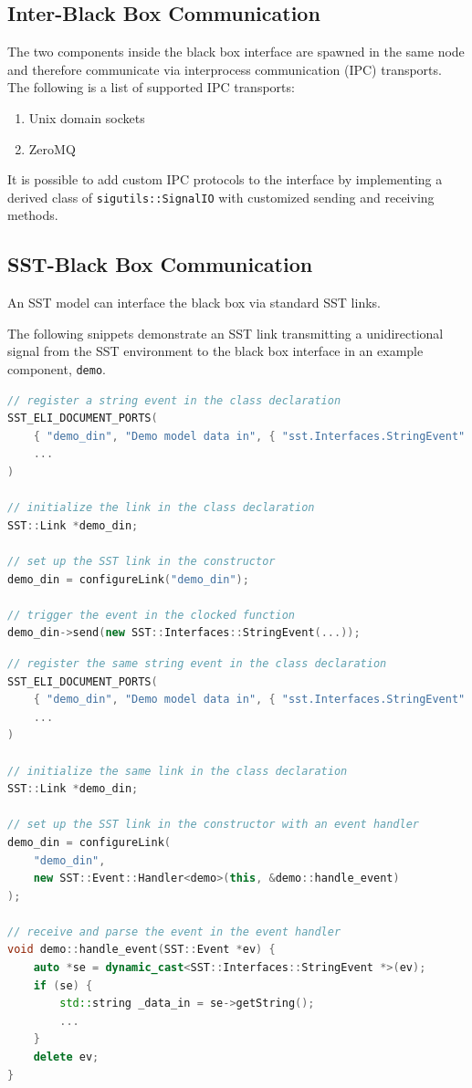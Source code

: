 \documentclass{article}
\begin{document}
    \subsection{Inter-Black Box Communication}
    The two components inside the black box interface are spawned in the same node and therefore
    communicate via interprocess communication (IPC) transports. The following is a list of
    supported IPC transports:
    \begin{enumerate}
      \item Unix domain sockets
      \item ZeroMQ
    \end{enumerate}

    It is possible to add custom IPC protocols to the interface by implementing a derived class of
    \lstinline{sigutils::SignalIO} with customized sending and receiving methods.

    \subsection{SST-Black Box Communication}
    An SST model can interface the black box via standard SST links.

    The following snippets demonstrate an SST link transmitting a unidirectional signal from the SST
    environment to the black box interface in an example component, \lstinline{demo}.

\begin{lstlisting}[language=C++, caption={Snippet of \lstinline{demo.cpp}}, captionpos=b]
// register a string event in the class declaration
SST_ELI_DOCUMENT_PORTS(
    { "demo_din", "Demo model data in", { "sst.Interfaces.StringEvent" }},
    ...
)

// initialize the link in the class declaration
SST::Link *demo_din;

// set up the SST link in the constructor
demo_din = configureLink("demo_din");

// trigger the event in the clocked function
demo_din->send(new SST::Interfaces::StringEvent(...));
\end{lstlisting}

\begin{lstlisting}[language=C++, caption={Snippet of \lstinline{blackboxes/demo_comp.cpp}}, captionpos=b]
// register the same string event in the class declaration
SST_ELI_DOCUMENT_PORTS(
    { "demo_din", "Demo model data in", { "sst.Interfaces.StringEvent" }},
    ...
)

// initialize the same link in the class declaration
SST::Link *demo_din;

// set up the SST link in the constructor with an event handler
demo_din = configureLink(
    "demo_din",
    new SST::Event::Handler<demo>(this, &demo::handle_event)
);

// receive and parse the event in the event handler
void demo::handle_event(SST::Event *ev) {
    auto *se = dynamic_cast<SST::Interfaces::StringEvent *>(ev);
    if (se) {
        std::string _data_in = se->getString();
        ...
    }
    delete ev;
}
\end{lstlisting}
\end{document}
